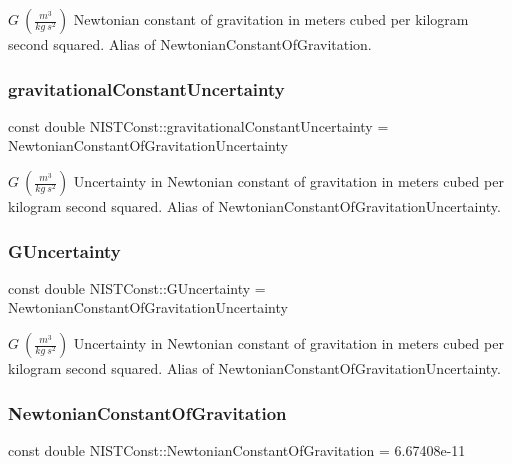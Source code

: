 $G \ (\frac{m^3}{kg\ s^2})$ Newtonian constant of gravitation in meters cubed per kilogram second squared. Alias of Newtonian\+Constant\+Of\+Gravitation. \mbox{\label{group___gravitational_constant_gae0af1dfa30856852c6c5a6936eb2354f}} 
\subsubsection{\texorpdfstring{gravitational\+Constant\+Uncertainty}{gravitationalConstantUncertainty}}
{\footnotesize\ttfamily const double N\+I\+S\+T\+Const\+::gravitational\+Constant\+Uncertainty = Newtonian\+Constant\+Of\+Gravitation\+Uncertainty}

$G \ (\frac{m^3}{kg\ s^2})$ Uncertainty in Newtonian constant of gravitation in meters cubed per kilogram second squared. Alias of Newtonian\+Constant\+Of\+Gravitation\+Uncertainty. \mbox{\label{group___gravitational_constant_gaf812b3fa9a3fa9f4ea48f77e00d3b205}} 
\subsubsection{\texorpdfstring{G\+Uncertainty}{GUncertainty}}
{\footnotesize\ttfamily const double N\+I\+S\+T\+Const\+::\+G\+Uncertainty = Newtonian\+Constant\+Of\+Gravitation\+Uncertainty}

$G \ (\frac{m^3}{kg\ s^2})$ Uncertainty in Newtonian constant of gravitation in meters cubed per kilogram second squared. Alias of Newtonian\+Constant\+Of\+Gravitation\+Uncertainty. \mbox{\label{group___gravitational_constant_gaba6371307f4cebde50b3c61a07c724c5}} 
\subsubsection{\texorpdfstring{Newtonian\+Constant\+Of\+Gravitation}{NewtonianConstantOfGravitation}}
{\footnotesize\ttfamily const double N\+I\+S\+T\+Const\+::\+Newtonian\+Constant\+Of\+Gravitation = 6.\+67408e-\/11}


